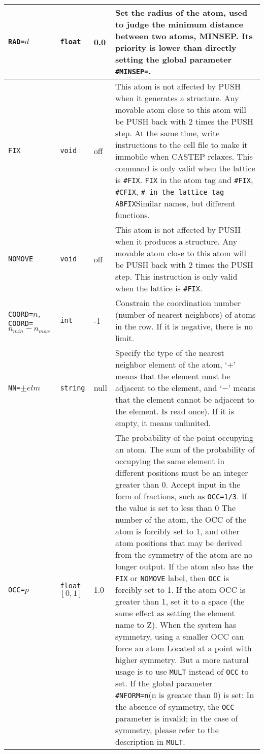 \documentclass[a4paper, 10pt]{article}
\begin{document}
\begin{center}
\begin{longtable}{m{10em}|m{4em}<{\centering}|m{3em}<{\centering}|m{15em}}
\midrule
\verb|RAD=|\(d\) & \verb|float| & 0.0 & Set the radius of the atom, used to judge the minimum distance between two atoms, MINSEP. Its priority is lower than directly setting the global parameter \verb|#MINSEP=|.\\
\midrule
\verb|FIX| & \verb|void| & off & This atom is not affected by PUSH when it generates a structure. Any movable atom close to this atom will be PUSH back with 2 times the PUSH step. At the same time, write instructions to the cell file to make it immobile when CASTEP relaxes. This command is only valid when the lattice is \verb|#FIX|. \verb|FIX| in the atom tag and \verb|#FIX|, \verb|#CFIX|, \verb|# in the lattice tag ABFIX|Similar names, but different functions. \\
\midrule
\verb|NOMOVE| & \verb|void| & off & This atom is not affected by PUSH when it produces a structure. Any movable atom close to this atom will be PUSH back with 2 times the PUSH step. This instruction is only valid when the lattice is \verb|#FIX|.\\
\midrule
\verb|COORD=|\(n\),\hspace{5em} \verb|COORD=|\(n_{min}-n_{max}\) & \verb|int| & -1 & Constrain the coordination number (number of nearest neighbors) of atoms in the row. If it is negative, there is no limit.\\
\midrule
\verb|NN=|\(\pm{}elm\)  & \verb|string| & null & Specify the type of the nearest neighbor element of the atom, `\(+\)' means that the element must be adjacent to the element, and `\(-\)' means that the element cannot be adjacent to the element. Is read once). If it is empty, it means unlimited.\\
\midrule
\verb|OCC=|\(p\) & \verb|float| \([0,1]\) & 1.0 & The probability of the point occupying an atom. The sum of the probability of occupying the same element in different positions must be an integer greater than 0. Accept input in the form of fractions, such as \verb|OCC=1/3|. If the value is set to less than 0 The number of the atom, the OCC of the atom is forcibly set to 1, and other atom positions that may be derived from the symmetry of the atom are no longer output. If the atom also has the \verb|FIX| or \verb|NOMOVE| label, then \verb |OCC| is forcibly set to 1. If the atom OCC is greater than 1, set it to a space (the same effect as setting the element name to Z). When the system has symmetry, using a smaller OCC can force an atom Located at a point with higher symmetry. But a more natural usage is to use \verb|MULT| instead of \verb|OCC| to set. If the global parameter \verb|#NFORM=n|(n is greater than 0) is set: In the absence of symmetry, the \verb|OCC| parameter is invalid; in the case of symmetry, please refer to the description in \verb|MULT|. \\

\end{longtable}
\end{center}
\end{document}
